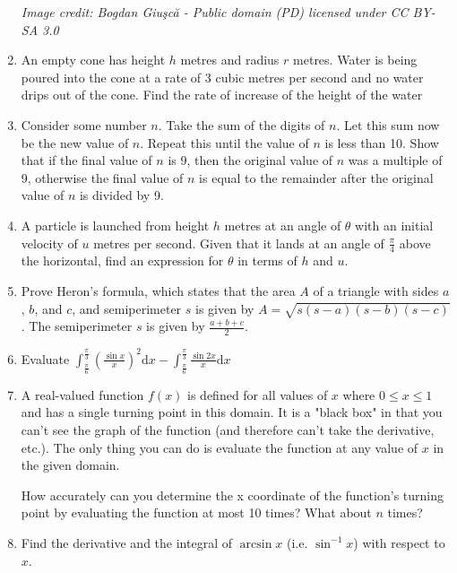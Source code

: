\documentclass[a4paper]{article}
\begin{document}
\begin{enumerate}
    \textit{Image credit: Bogdan Giuşcă - Public domain (PD) licensed under CC BY-SA 3.0}
    
    \item
    An empty cone has height $h$ metres and radius $r$ metres. Water is being poured into the cone at a rate of 3 cubic metres per second and no water drips out of the cone. Find the rate of increase of the height of the water

    \item
    Consider some number $n$. Take the sum of the digits of $n$. Let this sum now be the new value of $n$. Repeat this until the value of $n$ is less than 10. Show that if the final value of $n$ is 9, then the original value of $n$ was a multiple of 9, otherwise the final value of $n$ is equal to the remainder after the original value of $n$ is divided by 9.
    
    \item
    A particle is launched from height $h$ metres at an angle of $\theta$ with an initial velocity of $u$ metres per second. Given that it lands at an angle of $\frac{\pi}{4}$ above the horizontal, find an expression for $\theta$ in terms of $h$ and $u$.
    
    \item
    Prove Heron's formula, which states that the area $A$ of a triangle with sides $a$, $b$, and $c$, and semiperimeter $s$ is given by $A = \sqrt{s(s-a)(s-b)(s-c)}$. The semiperimeter $s$ is given by $\frac{a+b+c}{2}$.
    
    \item
    Evaluate $\int^{\frac{\pi}{3}}_{\frac{\pi}{6}} (\frac{\sin x}{x})^2 \mathrm{d}x - \int^{\frac{\pi}{3}}_{\frac{\pi}{6}} \frac{\sin 2x}{x} \mathrm{d}x$
    
    \item
    A real-valued function $f(x)$ is defined for all values of $x$ where $0 \leq x \leq 1$ and has a single turning point in this domain. It is a "black box" in that you can't see the graph of the function (and therefore can't take the derivative, etc.). The only thing you can do is evaluate the function at any value of $x$ in the given domain. 
    
    How accurately can you determine the x coordinate of the function's turning point by evaluating the function at most 10 times? What about $n$ times?
    
    
    
    \item
    Find the derivative and the integral of $\arcsin x$ (i.e. $\sin ^{-1} x$) with respect to $x$.
    

\end{enumerate}
\end{document}
